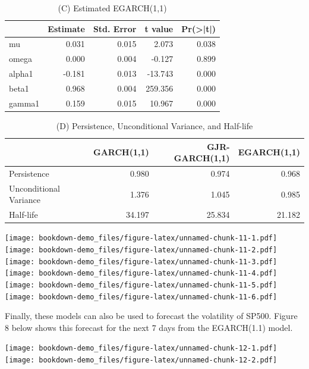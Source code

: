 \documentclass[]{book}
\theoremstyle{definition}
\theoremstyle{definition}
\theoremstyle{definition}
\theoremstyle{remark}
\begin{document}
\begin{table}[t]

\caption{\label{tab:unnamed-chunk-11}(C) Estimated EGARCH(1,1)}
\centering
\begin{tabular}{l|r|r|r|r}
\hline
  &  Estimate &  Std. Error &  t value & Pr(>|t|)\\
\hline
mu & 0.031 & 0.015 & 2.073 & 0.038\\
\hline
omega & 0.000 & 0.004 & -0.127 & 0.899\\
\hline
alpha1 & -0.181 & 0.013 & -13.743 & 0.000\\
\hline
beta1 & 0.968 & 0.004 & 259.356 & 0.000\\
\hline
gamma1 & 0.159 & 0.015 & 10.967 & 0.000\\
\hline
\end{tabular}
\end{table}

\begin{table}[t]

\caption{\label{tab:unnamed-chunk-11}(D) Persistence, Unconditional Variance, and Half-life}
\centering
\begin{tabular}{l|r|r|r}
\hline
  & GARCH(1,1) & GJR-GARCH(1,1) & EGARCH(1,1)\\
\hline
Persistence & 0.980 & 0.974 & 0.968\\
\hline
Unconditional Variance & 1.376 & 1.045 & 0.985\\
\hline
Half-life & 34.197 & 25.834 & 21.182\\
\hline
\end{tabular}
\end{table}

\texttt{[image: bookdown-demo\_files/figure-latex/unnamed-chunk-11-1.pdf]} \texttt{[image: bookdown-demo\_files/figure-latex/unnamed-chunk-11-2.pdf]} \texttt{[image: bookdown-demo\_files/figure-latex/unnamed-chunk-11-3.pdf]} \texttt{[image: bookdown-demo\_files/figure-latex/unnamed-chunk-11-4.pdf]} \texttt{[image: bookdown-demo\_files/figure-latex/unnamed-chunk-11-5.pdf]} \texttt{[image: bookdown-demo\_files/figure-latex/unnamed-chunk-11-6.pdf]}

Finally, these models can also be used to forecast the volatility of SP500. Figure 8 below shows this forecast for the next 7 days from the EGARCH(1.1) model.

\texttt{[image: bookdown-demo\_files/figure-latex/unnamed-chunk-12-1.pdf]} \texttt{[image: bookdown-demo\_files/figure-latex/unnamed-chunk-12-2.pdf]}

\hypertarget{appendix-appendix}{%
\appendix}
\end{document}
